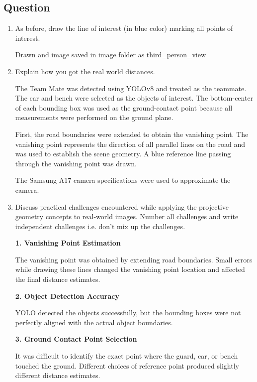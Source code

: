 \documentclass[12pt,a4paper]{article}
\newenvironment{studentSpace}{\par\medskip\noindent}{\par\bigskip}
\begin{document}
\subsection{Question}
\begin{enumerate}

\item As before, draw the line of interest (in blue color) marking all points of interest.

Drawn and image saved in image folder as third_person_view

\item Explain how you got the real world distances.

\begin{studentSpace}
The Team Mate was detected using YOLOv8 and treated as the teammate. The car and bench were selected as the objects of interest. The bottom-center of each bounding box was used as the ground-contact point because all measurements were performed on the ground plane.

First, the road boundaries were extended to obtain the vanishing point. The vanishing point represents the direction of all parallel lines on the road and was used to establish the scene geometry. A blue reference line passing through the vanishing point was drawn.

The Samsung A17 camera specifications were used to approximate the camera.
\end{studentSpace}

\item Discuss practical challenges encountered while applying the projective
geometry concepts to real-world images. Number all challenges and write independent challenges i.e. don't mix up the challenges.

\begin{studentSpace}

\textbf{1. Vanishing Point Estimation}

The vanishing point was obtained by extending road boundaries. Small errors while drawing these lines changed the vanishing point location and affected the final distance estimates.

\textbf{2. Object Detection Accuracy}

YOLO detected the objects successfully, but the bounding boxes were not perfectly aligned with the actual object boundaries.

\textbf{3. Ground Contact Point Selection}

It was difficult to identify the exact point where the guard, car, or bench touched the ground. Different choices of reference point produced slightly different distance estimates.


\end{studentSpace}
\end{enumerate}
\end{document}

